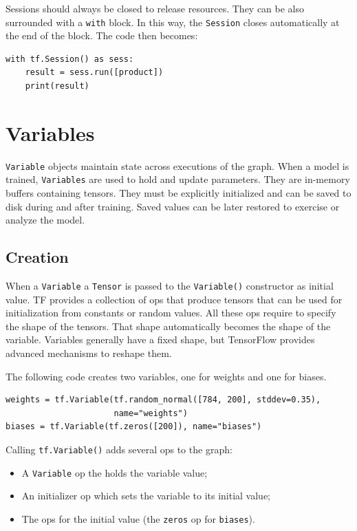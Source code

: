 Sessions should always be closed to release resources.  They can be also surrounded with a \lstinline|with| block. In this way, the \lstinline|Session| closes automatically at the end of the block. The code then becomes:

\begin{lstlisting}
with tf.Session() as sess:
    result = sess.run([product])
    print(result)
\end{lstlisting}

\section{Variables}

\lstinline|Variable| objects maintain state across executions of the graph. When a model is trained, \lstinline|Variables| are used to hold and update parameters. They are in-memory buffers containing tensors. They must be explicitly initialized and can be saved to disk during and after training. Saved values can be later restored to exercise or analyze the model.

\subsection{Creation}

When a \lstinline|Variable| a \lstinline|Tensor| is passed to the \lstinline|Variable()| constructor as initial value. \acs{TF} provides a collection of ops that produce tensors that can be used for initialization from constants or random values. All these ops require to specify the shape of the tensors. That shape automatically becomes the shape of the variable. Variables generally have a fixed shape, but TensorFlow provides advanced mechanisms to reshape them.

The following code creates two variables, one for weights and one for biases.

\begin{lstlisting}
weights = tf.Variable(tf.random_normal([784, 200], stddev=0.35),
                      name="weights")
biases = tf.Variable(tf.zeros([200]), name="biases")
\end{lstlisting}

Calling \lstinline|tf.Variable()| adds several ops to the graph:

\begin{itemize}
	\item A \lstinline|Variable| op the holds the variable value;
	\item An initializer op which sets the variable to its initial value;
	\item The ops for the initial value (\eg the \lstinline|zeros| op for \lstinline|biases|).
\end{itemize}

